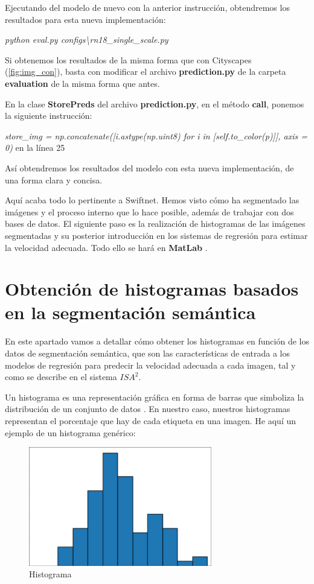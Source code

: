 Ejecutando del modelo de nuevo con la anterior instrucción, obtendremos los resultados para esta nueva implementación:

\begin{center}
\textit{python eval.py configs\textbackslash{rn18\_single\_scale.py}}
\end{center}

Si obtenemos los resultados de la misma forma que con Cityscapes (\ref{fig:img_con}), basta con modificar el archivo \textbf{prediction.py} de la carpeta \textbf{evaluation} de la misma forma que antes.

En la clase \textbf{StorePreds} del archivo \textbf{prediction.py}, en el método \textbf{call}, ponemos la siguiente instrucción:

\begin{center}
\textit{store\_img = np.concatenate([i.astype(np.uint8) for i in [self.to\_color(p)]], axis = 0)} en la línea 25
\end{center}

Así obtendremos los resultados del modelo con esta nueva implementación, de una forma clara y concisa.

Aquí acaba todo lo pertinente a Swiftnet. Hemos visto cómo ha segmentado las imágenes y el proceso interno que lo hace posible, además de trabajar con dos bases de datos. El siguiente paso es la realización de histogramas de las imágenes segmentadas y su posterior introducción en los sistemas de regresión para estimar la velocidad adecuada. Todo ello se hará en \textbf{MatLab} \cite{matlab}.

\section{Obtención de histogramas basados en la segmentación semántica}

En este apartado vamos a detallar cómo obtener los histogramas en función de los datos de segmentación semántica, que son las características de entrada a los modelos de regresión para predecir la velocidad adecuada a cada imagen, tal y como se describe en el sistema $ISA^{2}$.

Un histograma es una representación gráfica en forma de barras que simboliza la distribución de un conjunto de datos \cite{histograma}. En nuestro caso, nuestros histogramas representan el porcentaje que hay de cada etiqueta en una imagen. He aquí un ejemplo de un histograma genérico:

\begin{figure}[H]
  \centering
  \includegraphics[width=8cm]{Figuras/histograma.eps}
  \caption{Histograma}
\end{figure}

